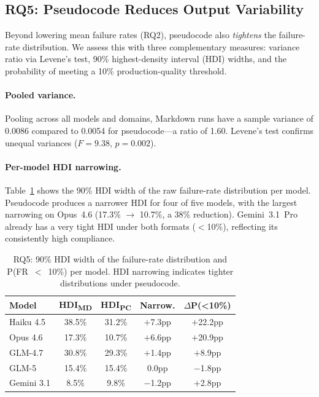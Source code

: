 \documentclass[sigconf,nonacm]{acmart}
\begin{document}
\subsection{RQ5: Pseudocode Reduces Output Variability}\label{sec:rq5}

Beyond lowering mean failure rates (RQ2), pseudocode also \emph{tightens}
the failure-rate distribution. We assess this with three complementary
measures: variance ratio via Levene's test, 90\% highest-density interval
(HDI) widths, and the probability of meeting a 10\% production-quality
threshold.

\paragraph{Pooled variance.}
Pooling across all models and domains, Markdown runs have a sample variance
of 0.0086 compared to 0.0054 for pseudocode---a ratio of 1.60.
Levene's test confirms unequal variances ($F = 9.38$, $p = 0.002$).

\paragraph{Per-model HDI narrowing.}
Table~\ref{tab:rq5_hdi} shows the 90\% HDI width of the raw failure-rate
distribution per model. Pseudocode produces a narrower HDI for four of five
models, with the largest narrowing on Opus~4.6 (17.3\% $\to$ 10.7\%, a 38\%
reduction). Gemini~3.1~Pro already has a very tight HDI under both formats
($<$10\%), reflecting its consistently high compliance.

\begin{table}[t]
\caption{RQ5: 90\% HDI width of the failure-rate distribution and
P(FR~$<$~10\%) per model. HDI narrowing indicates tighter distributions
under pseudocode.}
\label{tab:rq5_hdi}
\centering\small
\begin{tabular}{@{}lcccc@{}}
\toprule
\textbf{Model} & \textbf{HDI\textsubscript{MD}} & \textbf{HDI\textsubscript{PC}} & \textbf{Narrow.} & \textbf{$\Delta$P(\textless10\%)} \\
\midrule
Haiku 4.5 & 38.5\% & 31.2\% & $+$7.3pp & $+$22.2pp \\
Opus 4.6 & 17.3\% & 10.7\% & $+$6.6pp & $+$20.9pp \\
GLM-4.7 & 30.8\% & 29.3\% & $+$1.4pp & $+$8.9pp \\
GLM-5 & 15.4\% & 15.4\% & 0.0pp & $-$1.8pp \\
Gemini 3.1 & 8.5\% & 9.8\% & $-$1.2pp & $+$2.8pp \\
\bottomrule
\end{tabular}
\end{table}
\end{document}
